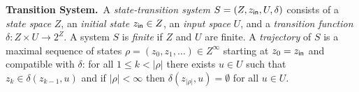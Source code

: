 \smallskip
\noindent\textbf{Transition System.}\
A \emph{state-transition system} $S=(Z,z_{\mathsf{in}},U,\delta)$ consists of a \emph{state space} $Z$, an \emph{initial state} $z_{\mathsf{in}}\in Z$, an \emph{input space} $U$, and a \emph{transition function} $\delta:Z\times U \rightarrow 2^Z$. 
A system $S$ is \emph{finite} if $Z$ and $U$ are finite. 
A \emph{trajectory} of $S$ is a maximal sequence of states $\rho = (z_0,z_1,\ldots) \in Z^\infty$ starting at $z_0=z_{\mathsf{in}}$ and compatible with $\delta$:
for all $1\leq k < |\rho|$ there exists $u\in U$ such that $z_k\in \delta(z_{k-1},u)$ and 
if $|\rho| < \infty$ then $\delta(z_{|\rho|},u)= \emptyset$ for all $u\in U$.


